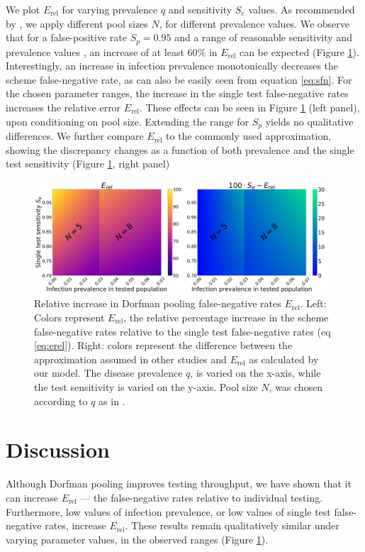 \documentclass{article}
\newcommand{\Se}{S_e}
\newcommand{\Sp}{S_p}
\newcommand{\rel}{E_{\text{rel}}}
\begin{document}
We plot $\rel$ for varying prevalence $q$ and sensitivity $\Se$ values. As recommended by \cite{DorfmanYuvalDor}, we apply different pool sizes $N$, for different prevalence values. We observe that for a false-positive rate $\Sp=0.95$ \cite{DorfmanYuvalDor} and a range of reasonable sensitivity and prevalence values \cite{KitComparison, InterpretingCOVID19Test, EstimatingRatesLourenco, FalsePositiveEstimate}, an increase of at least $60\%$ in $\rel$ can be expected (Figure \ref{figy}). Interestingly, an increase in infection prevalence monotonically decreases the scheme false-negative rate, as can also be easily seen from equation \eqref{eq:sfn}. For the chosen parameter ranges, the increase in the single test false-negative rates increases the relative error $\rel$. These effects can be seen in Figure \ref{figy} (left panel), upon conditioning on pool size. Extending the range for $\Sp$ yields no qualitative differences. We further compare $\rel$ to the commonly used approximation, showing the discrepancy changes as a function of both prevalence and the single test sensitivity (Figure \ref{figy}, right panel)   
\begin{figure}[H]
    \centering
    \includegraphics[width=18cm]{heatmap.jpg}
    \caption{Relative increase in Dorfman pooling false-negative rates $\rel$. Left: Colors represent $\rel$, the relative percentage increase in the scheme false-negative rates relative to the single test false-negative rates (eq \eqref{eq:erel}). Right: colors represent the difference between the approximation assumed in other studies and $\rel$ as calculated by our model. The disease prevalence $q$, is varied on the x-axis, while the test sensitivity is varied on the y-axis. Pool size $N$, was chosen according to $q$ as in \cite{DorfmanYuvalDor}.}\label{figy}
 \end{figure}


\section{Discussion}
Although Dorfman pooling improves testing throughput, we have shown that it can increase $\rel$ --- the false-negative rates relative to individual testing. Furthermore, low values of infection prevalence, or low values of single test false-negative rates, increase $\rel$. These results remain qualitatively similar under varying parameter values, in the observed ranges \cite{KitComparison,EstimatingRatesKucrika, EstimatingRatesLourenco, InterpretingCOVID19Test} (Figure \ref{figy}). 
\end{document}
